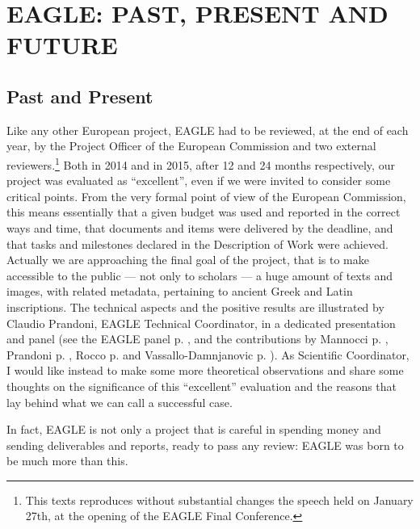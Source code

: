 \chapter{EAGLE: PAST, PRESENT AND FUTURE}

\section*{Past and Present}
Like any other European project, EAGLE had to be reviewed, at the end of each year, by the Project Officer of the European Commission and two external reviewers.\footnote{This texts reproduces without substantial changes the speech held on January 27th, at the opening of the EAGLE Final Conference.} Both in 2014 and in 2015, after 12 and 24 months respectively, our project was evaluated as ``excellent'', even if we were invited to consider some critical points. From the very formal point of view of the European Commission, this means essentially that a given budget was used and reported in the correct ways and time, that documents and items were delivered by the deadline, and that tasks and milestones declared in the Description of Work were achieved.
Actually we are approaching the final goal of the project, that is to make accessible to the public --- not only to scholars --- a huge amount of texts and images, with related metadata, pertaining to ancient Greek and Latin inscriptions. The technical aspects and the positive results are illustrated by Claudio Prandoni, EAGLE Technical Coordinator, in a dedicated presentation and panel (see the EAGLE panel p. \pageref{peaglepanel}, and the contributions by Mannocci p. \pageref{pCNR}, Prandoni p. \pageref{pXX}, Rocco p. \pageref{p28} and Vassallo-Damnjanovic p. \pageref{p44}). As Scientific Coordinator, I would like instead to make some more theoretical observations and share some thoughts on the significance of this ``excellent'' evaluation and the reasons that lay behind what we can call a successful case.

In fact, EAGLE is not only a project that is careful in spending money and sending deliverables and reports, ready to pass any review: EAGLE was born to be much more than this.



